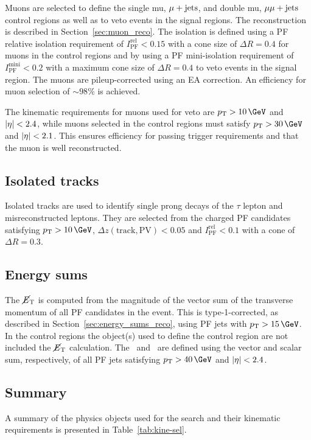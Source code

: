 Muons are selected to define the single mu, $\mu + \textrm{jets}$, and double mu, $\mu\mu + \textrm{jets}$ control regions as well as 
to veto events in the signal regions. The reconstruction is described in Section~\ref{sec:muon_reco}.
The isolation is defined using a PF relative isolation requirement of $I_{\text{PF}}^{\text{rel}} < 0.15$ 
with a cone size of $\Delta R = 0.4$ for muons in the control regions and by using a PF mini-isolation requirement of
$I_{\text{PF}}^{\text{mini}} < 0.2$ with a maximum cone size of $\Delta R = 0.4$ to veto events in the signal region. The muons are pileup-corrected
using an EA correction. An efficiency for muon selection of $\sim98\%$ is achieved.

The kinematic requirements for muons used for veto are $\pt > 10\,\GeV$ and $|\eta| < 2.4$, while muons 
selected in the control regions must satisfy $\pt > 30\,\GeV$ and $|\eta| < 2.1$. This ensures efficiency
for passing trigger requirements and that the muon is well reconstructed.


\subsection{Isolated tracks}

Isolated tracks are used to identify single prong decays of the $\tau$ lepton
and misreconstructed leptons. They are selected from the charged PF candidates 
satisfying $\pt > 10\,\GeV$, $\Delta z(\text{track},\text{PV}) < 0.05$ and 
$I_{\text{PF}}^{\text{rel}} < 0.1$ with a cone of $\Delta R = 0.3$.

\subsection{Energy sums}

The $\mbox{$\cancel{E}_\text{T}$}$ is computed from the magnitude of the vector sum of the transverse momentum of all PF candidates in
the event. This is type-1-corrected, as described in Section~\ref{sec:energy_sums_reco}, 
using PF jets with $\pt > 15\,\GeV$. In the control regions the object(s) used to define
the control region are not included the $\mbox{$\cancel{E}_\text{T}$}$ calculation. The \mht~and \scalht~are defined
using the vector and scalar sum, respectively, of all PF jets satisfying $\pt > 40\,\GeV$ and $|\eta| < 2.4$.

\subsection{Summary}

A summary of the physics objects used for the \alphat search and their
kinematic requirements is presented in Table~\ref{tab:kine-sel}.

